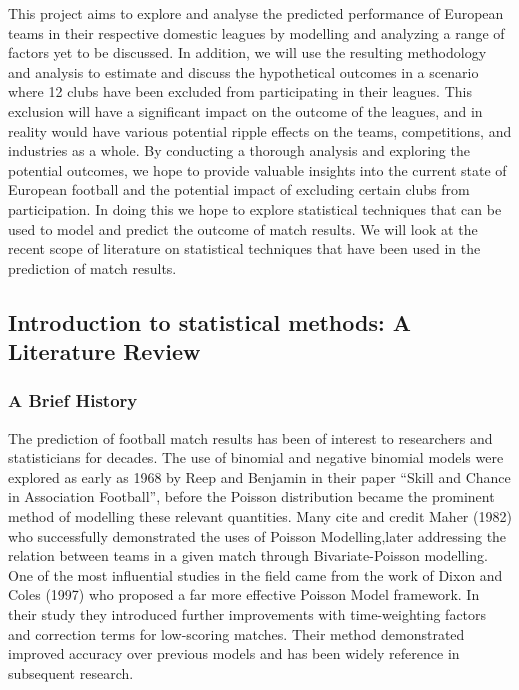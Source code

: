\documentclass[
]{article}
\begin{document}
This project aims to explore and analyse the predicted performance of
European teams in their respective domestic leagues by modelling and
analyzing a range of factors yet to be discussed. In addition, we will
use the resulting methodology and analysis to estimate and discuss the
hypothetical outcomes in a scenario where 12 clubs have been excluded
from participating in their leagues. This exclusion will have a
significant impact on the outcome of the leagues, and in reality would
have various potential ripple effects on the teams, competitions, and
industries as a whole. By conducting a thorough analysis and exploring
the potential outcomes, we hope to provide valuable insights into the
current state of European football and the potential impact of excluding
certain clubs from participation. In doing this we hope to explore
statistical techniques that can be used to model and predict the outcome
of match results. We will look at the recent scope of literature on
statistical techniques that have been used in the prediction of match
results.

\hypertarget{introduction-to-statistical-methods-a-literature-review}{%
\subsection{Introduction to statistical methods: A Literature
Review}\label{introduction-to-statistical-methods-a-literature-review}}

\hypertarget{a-brief-history}{%
\subsubsection{A Brief History}\label{a-brief-history}}

The prediction of football match results has been of interest to
researchers and statisticians for decades. The use of binomial and
negative binomial models were explored as early as 1968 by Reep and
Benjamin in their paper ``Skill and Chance in Association Football'',
before the Poisson distribution became the prominent method of modelling
these relevant quantities. Many cite and credit Maher (1982) who
successfully demonstrated the uses of Poisson Modelling,later addressing
the relation between teams in a given match through Bivariate-Poisson
modelling. One of the most influential studies in the field came from
the work of Dixon and Coles (1997) who proposed a far more effective
Poisson Model framework. In their study they introduced further
improvements with time-weighting factors and correction terms for
low-scoring matches. Their method demonstrated improved accuracy over
previous models and has been widely reference in subsequent research.
\end{document}
